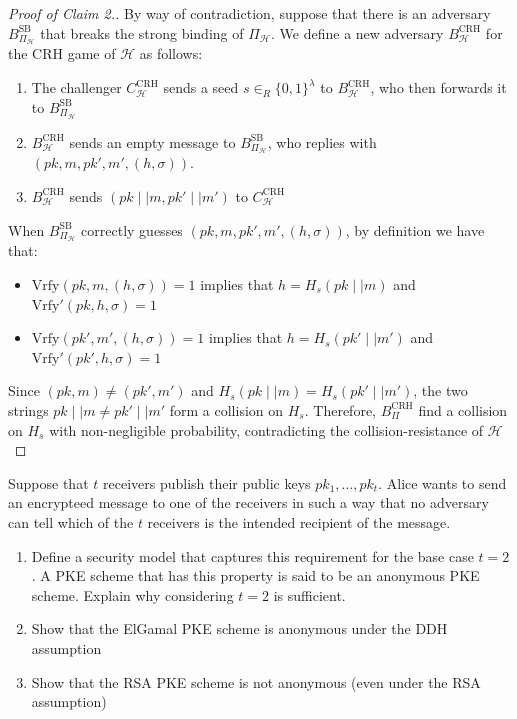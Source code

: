 \documentclass[a4paper, 12pt]{report}
\begin{document}
    \begin{proof}[Proof of Claim 2.]
        By way of contradiction, suppose that there is an adversary $B^{\text{SB}}_{\Pi_{\mathcal{H}}}$ that breaks the strong binding of $\Pi_{\mathcal{H}}$. We define a new adversary $B^{\text{CRH}}_{\mathcal{H}}$ for the CRH game of $\mathcal{H}$ as follows:
        \begin{enumerate}
            \item The challenger $C^{\text{CRH}}_{\mathcal{H}}$ sends a seed $s \in_R \{0,1\}^\lambda$ to $B^{\text{CRH}}_{\mathcal{H}}$, who then forwards it to $B^{\text{SB}}_{\Pi_\mathcal{H}}$
            \item $B^{\text{CRH}}_{\mathcal{H}}$ sends an empty message to $B^{\text{SB}}_{\Pi_\mathcal{H}}$, who replies with $(pk, m, pk', m', (h, \sigma))$.
            \item $B^{\text{CRH}}_{\mathcal{H}}$ sends $(pk \mid\mid m, pk' \mid\mid m')$ to $C^{\text{CRH}}_{\mathcal{H}}$
        \end{enumerate}

        When $B^{\text{SB}}_{\Pi_{\mathcal{H}}}$ correctly guesses $(pk, m, pk', m', (h, \sigma))$, by definition we have that:
        \begin{itemize}
            \item $\mathrm{Vrfy}(pk, m, (h, \sigma)) = 1$ implies that $h = H_s(pk \mid\mid m)$ and $\mathrm{Vrfy}'(pk, h, \sigma) = 1$
            \item $\mathrm{Vrfy}(pk', m', (h, \sigma)) = 1$ implies that $h = H_s(pk' \mid\mid m')$ and $\mathrm{Vrfy}'(pk', h, \sigma) = 1$
        \end{itemize}
        Since $(pk, m) \neq (pk', m')$ and $H_s(pk \mid\mid m) = H_s(pk' \mid\mid m')$, the two strings $pk \mid\mid m \neq pk' \mid\mid m'$ form a collision on $H_s$. Therefore, $B^{\text{CRH}}_{\Pi}$ find a collision on $H_s$ with non-negligible probability, contradicting the collision-resistance of $\mathcal{H}$
    \end{proof}

    \begin{framedprob}{}
        Suppose that $t$ receivers publish their public keys $pk_1, \ldots, pk_t$. Alice wants to send an encrypteed message to one of the receivers in such a way that no adversary can tell which of the $t$ receivers is the intended recipient of the message.
        \begin{enumerate}
            \item Define a security model that captures this requirement for the base case $t = 2$. A PKE scheme that has this property is said to be an anonymous PKE scheme. Explain why considering $t = 2$ is sufficient.
            \item Show that the ElGamal PKE scheme is anonymous under the DDH assumption
            \item Show that the RSA PKE scheme is not anonymous (even under the RSA assumption)
        \end{enumerate}
    \end{framedprob}
\end{document}
